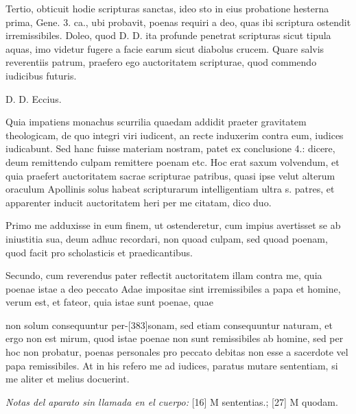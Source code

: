 Tertio, obticuit hodie scripturas sanctas, ideo sto in eius probatione hesterna prima, Gene. 3. ca., ubi probavit, poenas requiri a deo, quas ibi scriptura ostendit irremissibiles. Doleo, quod D. D. ita profunde penetrat scripturas sicut tipula aquas, imo videtur fugere a facie earum sicut diabolus crucem. Quare salvis reverentiis patrum, praefero ego auctoritatem scripturae, quod commendo iudicibus futuris.

D. D. Eccius.

Quia impatiens monachus scurrilia quaedam addidit praeter gravitatem theologicam, de quo integri viri iudicent, an recte induxerim contra eum, iudices iudicabunt. Sed hanc fuisse materiam nostram, patet ex conclusione 4.: dicere, deum remittendo culpam remittere poenam etc. Hoc erat saxum volvendum, et quia praefert auctoritatem sacrae scripturae patribus, quasi ipse velut alterum oraculum Apollinis solus habeat scripturarum intelligentiam ultra s. patres, et apparenter inducit auctoritatem heri per me citatam, dico duo.

Primo me adduxisse in eum finem, ut ostenderetur, cum impius avertisset se ab iniustitia sua, deum adhuc recordari, non quoad culpam, sed quoad poenam, quod facit pro scholasticis et praedicantibus.

Secundo, cum reverendus pater reflectit auctoritatem illam contra me, quia poenae istae a deo peccato Adae impositae sint irremissibiles a papa et homine, verum est, et fateor, quia istae sunt poenae, quae

non solum consequuntur per-[383]sonam, sed etiam consequuntur naturam, et ergo non est mirum, quod istae poenae non sunt remissibiles ab homine, sed per hoc non probatur, poenas personales pro peccato debitas non esse a sacerdote vel papa remissibiles. At in his refero me ad iudices, paratus mutare sententiam, si me aliter et melius docuerint.

\noindent\textit{Notas del aparato sin llamada en el cuerpo:} [16] M sententias.; [27] M quodam.
